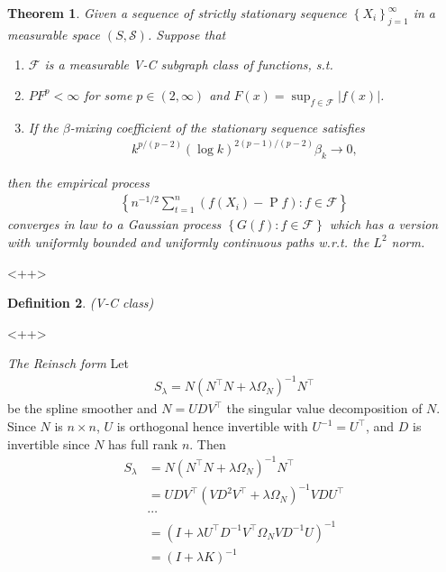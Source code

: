 \documentclass[12pt,a4paper]{article}
\newcommand{\pr}{\mathop{\mathrm{P}}}
\def \trans{^\intercal}
\def \sumn {\displaystyle\sum_{t=1}^n}
\def \S {\mathcal{S}}
\newtheorem{theorem}{Theorem}[section]
\newtheorem{definition}[theorem]{Definition}
\begin{document}
\begin{theorem}
  \citep{ArconesYu1994} 
  Given a sequence of strictly stationary sequence $\left\{ X_i \right\}_{j=1}^\infty$ in a measurable space $(S,\S)$. 
  Suppose that 
  \begin{enumerate}
	\item $\mathscr{F}$ is a measurable V-C subgraph class of functions, s.t.
	\item $P F^p<\infty$ for some $p\in(2,\infty)$ and $F(x)=\sup_{f\in\mathscr{F}}|f(x)|$.  
    \item If the $\beta$-mixing coefficient of the stationary sequence satisfies
  \begin{align*}
	k^{p/(p-2)} (\log k)^{2(p-1)/(p-2)}\beta_k \to 0,
  \end{align*}
  \end{enumerate}
  then the empirical process
  \begin{align*}
	\left\{ n^{-1/2} \sumn \left( f(X_i) - \pr f \right):f\in\mathscr{F} \right\}
  \end{align*}
  converges in law to a Gaussian process $\left\{ G(f):f\in\mathscr{F} \right\}$ which has a version with uniformly bounded and uniformly continuous paths w.r.t. the $L^2$ norm.  \label{}
\end{theorem}<++>

\begin{definition}
  (V-C class)

\end{definition}<++>


{\em The Reinsch form} Let 
\begin{align*}
  S_\lambda = N(N\trans N + \lambda \Omega_N)^{-1}N\trans 
\end{align*}
be the spline smoother and $N=UDV\trans$ the singular value decomposition of $N$. Since $N$ is $n\times n$, $U$ is orthogonal hence invertible with $U^{-1}=U\trans$, and $D$ is invertible since $N$ has full rank $n$. Then
\begin{align*}
  S_\lambda 
  & = N(N\trans N + \lambda \Omega_N)^{-1}N\trans \\
  & = UDV\trans(VD^2V\trans + \lambda \Omega_N)^{-1}VDU\trans \\
  & \cdots\\
  & = (I  + \lambda U\trans D^{-1}V\trans \Omega_N VD^{-1}U)^{-1} \\
  & = (I  + \lambda K)^{-1} \\
\end{align*}
\end{document}
